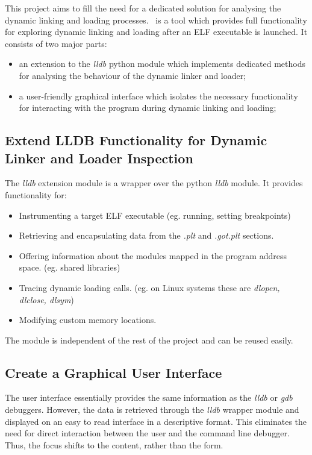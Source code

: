 This project aims to fill the need for a dedicated solution for analysing the dynamic linking and loading processes. \project\ is a tool which provides full functionality for exploring dynamic linking and loading after an ELF executable is launched. It consists of two major parts:
\begin{itemize}
\item an extension to the \textit{lldb} python module which implements dedicated methods for analysing the behaviour of the dynamic linker and loader;
\item a user-friendly graphical interface which isolates the necessary functionality for interacting with the program during dynamic linking and loading;
\end{itemize}

\subsection{Extend LLDB Functionality for Dynamic Linker and Loader Inspection}
\label{sub-sec:lldb-extension}

The \textit{lldb} extension module is a wrapper over the python \textit{lldb} module. It provides functionality for:
\begin{itemize}
\item Instrumenting a target ELF executable (eg. running, setting breakpoints)
\item Retrieving and encapsulating data from the \textit{.plt} and \textit{.got.plt} sections.
\item Offering information about the modules mapped in the program address space. (eg. shared libraries)
\item Tracing dynamic loading calls. (eg. on Linux systems these are \textit{dlopen, dlclose, dlsym})
\item Modifying custom memory locations.
\end{itemize}

The module is independent of the rest of the project and can be reused easily.

\subsection{Create a Graphical User Interface}
\label{sub-sec:gui}

The user interface essentially provides the same information as the \textit{lldb} or \textit{gdb} debuggers. However, the data is retrieved through the \textit{lldb} wrapper module and displayed on an easy to read interface in a descriptive format. This eliminates the need for direct interaction between the user and the command line debugger. Thus, the focus shifts to the content, rather than the form.

